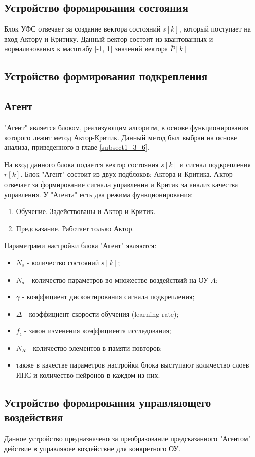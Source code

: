 \subsection{Устройство формирования состояния} \label{subsect2_2_2}
Блок УФС отвечает за создание вектора состояний $s[k]$, который поступает на вход Актору и Критику. Данный вектор состоит из квантованных и нормализованых к масштабу [-1, 1] значений вектора $\bar{P}[k]$ 

\subsection{Устройство формирования подкрепления} \label{subsect2_2_3}

\subsection{Агент} \label{subsect2_2_4}
"Агент" является блоком, реализующим алгоритм, в основе функционирования которого лежит метод Актор-Критик. Данный метод был выбран на основе анализа, приведенного в главе \ref{subsect1_3_6}.

На вход данного блока подается вектор состояния $s[k]$ и сигнал подкрепления $r[k]$. Блок "Агент" состоит из двух подблоков: Актора и Критика. Актор отвечает за формирование сигнала управления и Критик за анализ качества управления. У "Агента" есть два режима функционирования:
\begin{enumerate}
	\item Обучение. Задействованы и Актор и Критик.
	\item Предсказание. Работает только Актор.
\end{enumerate} 

Параметрами настройки блока "Агент" являются:
\begin{itemize}
	\item $ N_s $ - количество состояний $s[k]$;
	\item $ N_a $ - количество параметров во множестве воздействий на ОУ $ A $;
	\item $ \gamma $ - коэффициент дисконтирования сигнала подкрепления;
	\item $ \Delta $ - коэффициент скорости обучения (learning rate);
	\item $ f_{\epsilon} $ - закон изменения коэффициента исследования;
	\item $ N_R $ - количество элементов в памяти повторов;
	\item также в качестве параметров настройки блока выступают количество слоев ИНС и количество нейронов в каждом из них.
\end{itemize}

\subsection{Устройство формирования управляющего воздействия} \label{subsect2_2_5}
Данное устройство предназначено за преобразование предсказанного "Агентом" действие в управляюее воздействие для конкретного ОУ.

